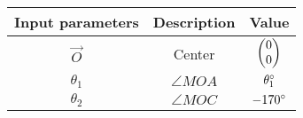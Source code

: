     \begin{tabular}{|c|c|c|}
    \hline
        \textbf{Input parameters} &\textbf{Description}&\textbf{Value}  \\
        \hline
        $\vec{O}$&Center&$\begin{pmatrix}0\\0\end{pmatrix}$\\
        \hline
        $\theta_1$ &$\angle MOA$ &$\theta_1\degree$ \\
        \hline
         $\theta_2$ &$\angle MOC$& $-170\degree$\\
        \hline
    \end{tabular}
